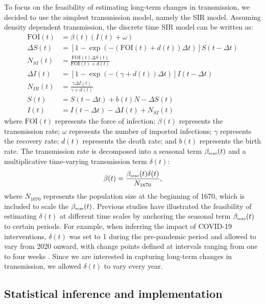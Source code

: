 \documentclass[12pt]{article}
\newcommand{\tsub}[2]{#1_{{\textrm{\tiny #2}}}}
\begin{document}
To focus on the feasibility of estimating long-term changes in transmission, we decided to use the simplest transmission model, namely the SIR model.
Assuming density dependent transmission, the discrete time SIR model can be written as:
\begin{align}
\mathrm{FOI}(t) &= \beta(t) (I(t) + \omega) \\
\Delta S(t) &= \left[1- \exp(-(\mathrm{FOI}(t) + d(t)) \Delta t )\right] S(t-\Delta t)\\
N_{SI}(t) &= \frac{\mathrm{FOI}(t)\Delta S(t)}{\mathrm{FOI}(t) + d(t)} \\
\Delta I(t) &= \left[1- \exp(-(\gamma + d(t)) \Delta t )\right] I(t-\Delta t)\\
N_{IR}(t) &= \frac{\gamma \Delta I(t)}{\gamma + d(t)} \\
S(t) &= S(t-\Delta t) + b(t) N - \Delta S(t) \\
I(t) &= I(t-\Delta t) - \Delta I(t) + N_{SI}(t)
\end{align}
where $\mathrm{FOI}(t)$ represents the force of infection;
$\beta(t)$ represents the transmission rate;
$\omega$ represents the number of imported infections;
$\gamma$ represents the recovery rate;
$d(t)$ represents the death rate;
and $b(t)$ represents the birth rate.
The transmission rate is decomposed into a seasonal term $\tsub{\beta}{seas}(t)$ and a multiplicative time-varying transmission term $\delta(t)$:
\begin{equation}
\beta(t) = \frac{\tsub{\beta}{seas}(t) \delta(t)}{N_{1670}},
\end{equation}
where $N_{1670}$ represents the population size at the beginning of 1670, which is included to scale the $\tsub{\beta}{seas}(t)$.
Previous studies have illustrated the feasibility of estimating $\delta(t)$ at different time scales by anchoring the seasonal term $\tsub{\beta}{seas}(t)$ to certain periods.
For example, when inferring the impact of COVID-19 interventions, $\delta(t)$ was set to 1 during the pre-pandemic period and allowed to vary from 2020 onward, with change points defined at intervals ranging from one to four weeks \citep{park2024predicting,nielsen2025complex,park2025interplay}.
Since we are interested in capturing long-term changes in transmission, we allowed $\delta(t)$ to vary every year.

\subsection*{Statistical inference and implementation}
\end{document}
